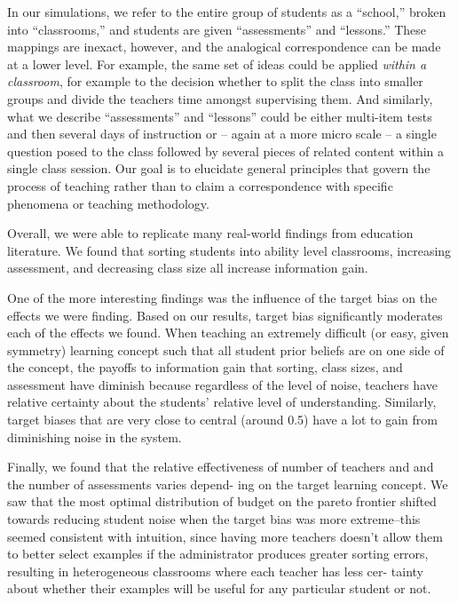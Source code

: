 \documentclass[man]{apa6}
\begin{document}
In our simulations, we refer to the entire group of students as a
``school,'' broken into ``classrooms,'' and students are given
``assessments'' and ``lessons.'' These mappings are inexact, however,
and the analogical correspondence can be made at a lower level. For
example, the same set of ideas could be applied \emph{within a
classroom}, for example to the decision whether to split the class into
smaller groups and divide the teachers time amongst supervising them.
And similarly, what we describe ``assessments'' and ``lessons'' could be
either multi-item tests and then several days of instruction or -- again
at a more micro scale -- a single question posed to the class followed
by several pieces of related content within a single class session. Our
goal is to elucidate general principles that govern the process of
teaching rather than to claim a correspondence with specific phenomena
or teaching methodology.

Overall, we were able to replicate many real-world findings from
education literature. We found that sorting students into ability level
classrooms, increasing assessment, and decreasing class size all
increase information gain.

One of the more interesting findings was the influence of the target
bias on the effects we were finding. Based on our results, target bias
significantly moderates each of the effects we found. When teaching an
extremely difficult (or easy, given symmetry) learning concept such that
all student prior beliefs are on one side of the concept, the payoffs to
information gain that sorting, class sizes, and assessment have diminish
because regardless of the level of noise, teachers have relative
certainty about the students' relative level of understanding.
Similarly, target biases that are very close to central (around 0.5)
have a lot to gain from diminishing noise in the system.

Finally, we found that the relative effectiveness of number of teachers
and and the number of assessments varies depend- ing on the target
learning concept. We saw that the most optimal distribution of budget on
the pareto frontier shifted towards reducing student noise when the
target bias was more extreme--this seemed consistent with intuition,
since having more teachers doesn't allow them to better select examples
if the administrator produces greater sorting errors, resulting in
heterogeneous classrooms where each teacher has less cer- tainty about
whether their examples will be useful for any particular student or not.
\end{document}
